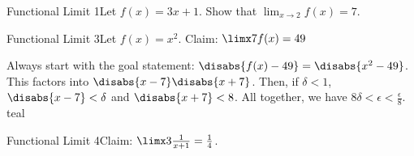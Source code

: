 \begin{example}
    {Functional Limit 1}Let \(f(x) = 3x + 1\). Show that \(\lim_{x \rightarrow 2}f(x) = 7\).
\end{example}




\begin{example}
    {Functional Limit 3}Let \(f(x) = x^{2}\). Claim: \(\limx 7{f(x)} = 49\)
\end{example}

%
{
    Always start with the goal statement: \(\disabs{f(x) - 49} = \disabs{x^{2} - 49}\). This factors into \(\disabs{x - 7} \disabs{x + 7}\). Then, if \(\delta < 1\), \(\disabs{x - 7} < \delta\) and \(\disabs{x + 7} < 8\). All together, we have \(8\delta < \epsilon < \frac{\epsilon}{8}\).
}%
{teal}

\begin{example}
    {Functional Limit 4}Claim: \(\limx 3{\frac{1}{x + 1}} = \frac{1}{4}\).
\end{example}

